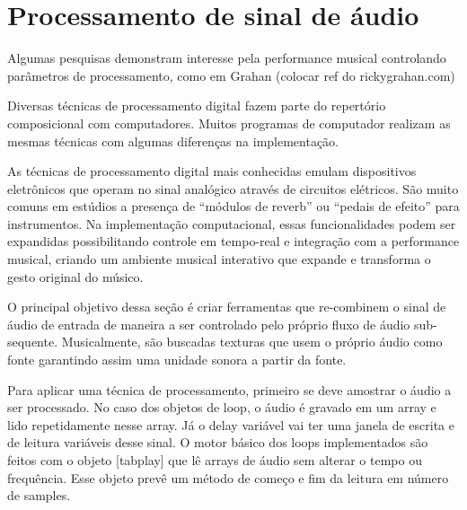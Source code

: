 \documentclass{ppgmus}
\begin{document}
\section{Processamento de sinal de áudio}


Algumas pesquisas demonstram interesse pela 
performance musical controlando parâmetros de processamento, como
em Grahan (colocar ref do rickygrahan.com)




Diversas técnicas de processamento digital fazem parte do repertório
composicional com computadores. Muitos programas de computador realizam
as mesmas técnicas com algumas diferenças na implementação.

As técnicas de processamento digital mais conhecidas emulam dispositivos
eletrônicos que operam no sinal analógico através de circuitos elétricos.
São muito comuns em estúdios a presença de ``módulos de reverb'' ou 
``pedais de efeito'' para instrumentos. Na implementação computacional,
essas funcionalidades podem ser expandidas possibilitando controle em
tempo-real e integração com a performance musical, criando um ambiente
musical interativo que expande e transforma o gesto original do músico.

O principal objetivo dessa seção é criar ferramentas que re-combinem
o sinal de áudio de entrada de maneira a ser controlado pelo próprio
fluxo de áudio sub-sequente. Musicalmente, são buscadas texturas que usem
o próprio áudio como fonte garantindo assim uma unidade sonora a partir da fonte.

Para aplicar uma técnica de processamento, primeiro se deve amostrar
o áudio a ser processado. No caso dos objetos de loop, o áudio é gravado
em um array e lido repetidamente nesse array. Já o delay variável vai ter uma
janela de escrita e de leitura variáveis desse sinal. O motor básico dos loops 
implementados são feitos com o objeto [tabplay\texttildelow] que lê arrays
de áudio sem alterar o tempo ou frequência. Esse objeto prevê um método de começo e fim
da leitura em número de samples.
\end{document}
